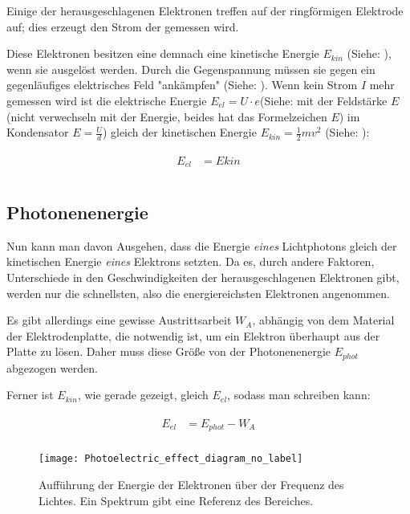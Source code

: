 Einige der herausgeschlagenen Elektronen treffen auf der ringförmigen Elektrode auf; dies erzeugt den Strom der gemessen wird.

Diese Elektronen besitzen eine demnach eine kinetische Energie $E_{kin}$ (Siehe: ), wenn sie ausgelöst werden. Durch die Gegenspannung müssen sie gegen ein gegenläufiges elektrisches Feld "ankämpfen" (Siehe: ). Wenn kein Strom $I$ mehr gemessen wird ist die elektrische Energie $E_{el} = U \cdot e$(Siehe:  mit der Feldstärke $E$ (nicht verwechseln mit der Energie, beides hat das Formelzeichen $E$) im Kondensator $E=\frac{U}{d}$) gleich der kinetischen Energie $E_{kin} = \frac{1}{2} m v^2$ (Siehe: ):

\begin{align}
\begin{split}
	E_{el} &= E{kin} \\
\end{split}
\end{align}


\subsection{Photonenenergie}

Nun kann man davon Ausgehen, dass die Energie \emph{eines} Lichtphotons gleich der kinetischen Energie \emph{eines} Elektrons setzten. Da es, durch andere Faktoren, Unterschiede in den Geschwindigkeiten der herausgeschlagenen Elektronen gibt, werden nur die schnellsten, also die energiereichsten Elektronen angenommen. 

Es gibt allerdings eine gewisse Austrittsarbeit $W_A$, abhängig von dem Material der Elektrodenplatte, die notwendig ist, um ein Elektron überhaupt aus der Platte zu lösen. Daher muss diese Größe von der Photonenenergie $E_{phot}$ abgezogen werden.

Ferner ist $E_{kin}$, wie gerade gezeigt, gleich $E_{el}$, sodass man schreiben kann:

\begin{align} \label{eq:EelmitWA}
\begin{split}
	E_{el} &= E_{phot} - W_A \\
\end{split}
\end{align}

\begin{figure}[h!]
	\centering
	\texttt{[image: Photoelectric\_effect\_diagram\_no\_label]}
	\caption{Aufführung der Energie der Elektronen über der Frequenz des Lichtes. Ein Spektrum gibt eine Referenz des Bereiches.}
	\label{fig:Fotoeffekt}
\end{figure}

